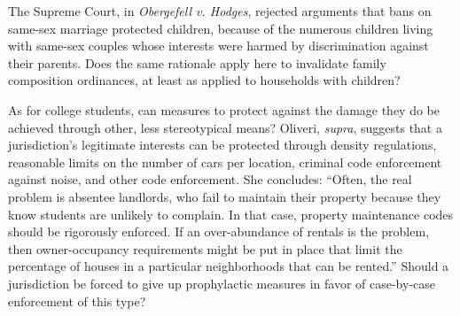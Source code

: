 \item
The Supreme Court, in \textit{Obergefell v. Hodges}, rejected arguments that
bans on same-sex marriage protected children, because of the numerous children
living with same-sex couples whose interests were harmed by discrimination
against their parents. Does the same rationale apply here to invalidate family
composition ordinances, at least as applied to households with children?

\item
As for college students, can measures to protect against the damage they do be
achieved through other, less stereotypical means? Oliveri, \textit{supra},
suggests that a jurisdiction's legitimate interests can be protected through
density regulations, reasonable limits on the number of cars per location,
criminal code enforcement against noise, and other code enforcement. She
concludes: ``Often, the real problem is absentee landlords, who fail to maintain
their property because they know students are unlikely to complain. In that
case, property maintenance codes should be rigorously enforced. If an
over-abundance of rentals is the problem, then owner-occupancy requirements
might be put in place that limit the percentage of houses in a particular
neighborhoods that can be rented.'' Should a jurisdiction be forced to give up
prophylactic measures in favor of case-by-case enforcement of this type? 

